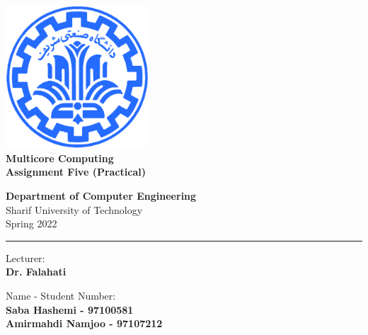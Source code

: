 \documentclass[12pt]{article}
\begin{document}
	
	
	\begin{titlepage}
		\begin{center}
			
			\vspace*{0.7cm}
			
			\includegraphics[width=0.4\textwidth]{sharif1.png}\\
			\vspace{0.5cm}
			\textbf{ \Huge{Multicore Computing} }\\
			\vspace{0.5cm}
			\textbf{ \Large{ Assignment Five (Practical)} }
			\vspace{0.2cm}
			
			
			\large \textbf{Department of Computer Engineering}\\\vspace{0.2cm}
			\large   Sharif University of Technology\\\vspace{0.2cm}
			\large   Spring 2022 \\\vspace{0.2cm}
			\noindent\rule[1ex]{\linewidth}{1pt}
			Lecturer:\\
			\textbf{{Dr. Falahati}}
			
			
			\vspace{0.15cm}
			Name - Student Number:\\
			
			\textbf{{Saba Hashemi - 97100581}}\\
			
			\textbf{{Amirmahdi Namjoo - 97107212}}
		\end{center}
	\end{titlepage}
	
	
	\newpage
	\pagestyle{fancy}
	\fancyhf{}
	\fancyfoot{}
	\cfoot{\thepage}
	
\end{document}
